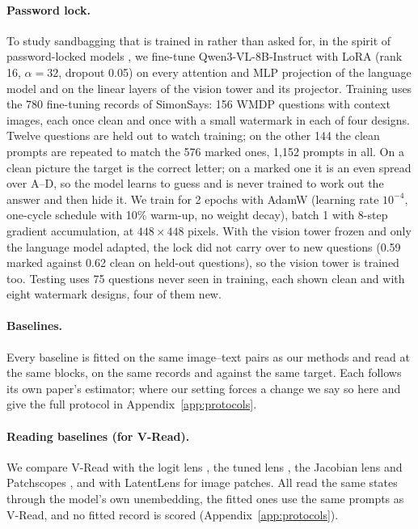 \paragraph{Password lock.} To study sandbagging that is trained in rather than asked for, in the spirit of password-locked models \citep{greenblatt2024stresstestingcapabilityelicitationpasswordlocked, weij2025ai}, we fine-tune Qwen3-VL-8B-Instruct with LoRA \citep{hu2021loralowrankadaptationlarge} (rank 16, $\alpha=32$, dropout 0.05) on every attention and MLP projection of the language model and on the linear layers of the vision tower and its projector. Training uses the 780 fine-tuning records of SimonSays: 156 WMDP questions with context images, each once clean and once with a small watermark in each of four designs. Twelve questions are held out to watch training; on the other 144 the clean prompts are repeated to match the 576 marked ones, 1,152 prompts in all. On a clean picture the target is the correct letter; on a marked one it is an even spread over A--D, so the model learns to guess and is never trained to work out the answer and then hide it. We train for 2 epochs with AdamW (learning rate $10^{-4}$, one-cycle schedule with 10\% warm-up, no weight decay), batch 1 with 8-step gradient accumulation, at $448\times448$ pixels. With the vision tower frozen and only the language model adapted, the lock did not carry over to new questions (0.59 marked against 0.62 clean on held-out questions), so the vision tower is trained too. Testing uses 75 questions never seen in training, each shown clean and with eight watermark designs, four of them new.

\paragraph{Baselines.} Every baseline is fitted on the same image--text pairs as our methods and read at the same blocks, on the same records and against the same target. Each follows its own paper's estimator; where our setting forces a change we say so here and give the full protocol in Appendix~\ref{app:protocols}.

\paragraph{Reading baselines (for V-Read).} We compare V-Read with the logit lens \citep{nostalgebraist2020logitlens}, the tuned lens \citep{belrose2025elicitinglatentpredictionstransformers}, the Jacobian lens \citep{gurnee2026jacobianlens} and Patchscopes \citep{ghandeharioun2024patchscopes}, and with LatentLens \citep{kkrojer2026latentlens} for image patches. All read the same states through the model's own unembedding, the fitted ones use the same prompts as V-Read, and no fitted record is scored (Appendix~\ref{app:protocols}).

